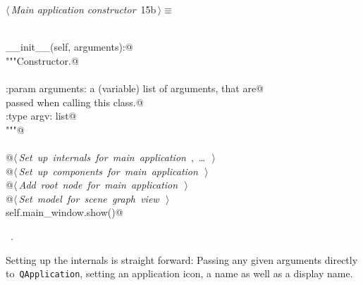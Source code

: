 \documentclass[
    a4paper,      %
    10pt,         %
    openright,    %
    notitlepage,  %
    parskip=half, %
]{scrreprt}       %
\theoremstyle{definition}                    %
\begin{document}
\begin{flushleft} \small
\begin{minipage}{\linewidth}\label{scrap3}\raggedright\small
{} $\langle\,${\itshape Main application constructor}\nobreak\ {\footnotesize {15b}}$\,\rangle\equiv$
\vspace{-1ex}
\begin{list}{}{} \item
\mbox{}\lstinline@@\\
\mbox{}\lstinline@def __init__(self, arguments):@\\
\mbox{}\lstinline@    """Constructor.@\\
\mbox{}\lstinline@@\\
\mbox{}\lstinline@    :param arguments: a (variable) list of arguments, that are@\\
\mbox{}\lstinline@                      passed when calling this class.@\\
\mbox{}\lstinline@    :type  argv:      list@\\
\mbox{}\lstinline@    """@\\
\mbox{}\lstinline@@\\
\mbox{}\lstinline@    @\hbox{$\langle\,${\itshape Set up internals for main application}\nobreak\ {\footnotesize {}, \ldots\ }$\,\rangle$}\lstinline@@\\
\mbox{}\lstinline@    @\hbox{$\langle\,${\itshape Set up components for main application}\nobreak\ {\footnotesize {}}$\,\rangle$}\lstinline@@\\
\mbox{}\lstinline@    @\hbox{$\langle\,${\itshape Add root node for main application}\nobreak\ {\footnotesize {}}$\,\rangle$}\lstinline@@\\
\mbox{}\lstinline@    @\hbox{$\langle\,${\itshape Set model for scene graph view}\nobreak\ {\footnotesize {}}$\,\rangle$}\lstinline@@\\
\mbox{}\lstinline@    self.main_window.show()@\\
\mbox{}\lstinline@@{\NWsep}
\end{list}
\vspace{-1.5ex}
\footnotesize
\begin{list}{}{\setlength{\itemsep}{-\parsep}\setlength{\itemindent}{-\leftmargin}}
\item \NWtxtMacroRefIn\ .

\item{}
\end{list}
\end{minipage}\vspace{4ex}
\end{flushleft}
Setting up the internals is straight forward: Passing any given arguments
directly to~\verb+QApplication+, setting an application icon, a name as well as
a display name.
\end{document}
